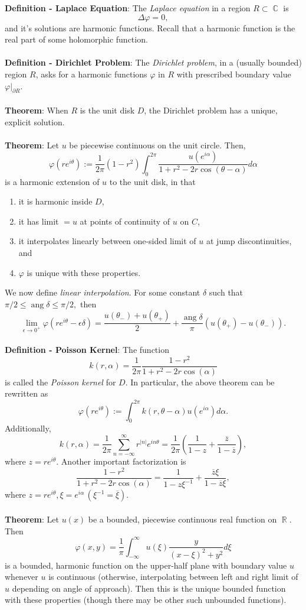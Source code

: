 \documentclass{article}
\DeclareMathOperator{\R}{\mathbb{R}}
\DeclareMathOperator{\C}{\mathbb{C}}
\DeclareMathOperator{\ang}{ang}
\begin{document}
\textbf{Definition - Laplace Equation}: The \textit{Laplace equation} in a region $R \subset \C$ is $$\Delta \varphi = 0,$$ and it's solutions are harmonic functions. Recall that a harmonic function is the real part of some holomorphic function. \\ \\
\textbf{Definition - Dirichlet Problem}: The \textit{Dirichlet problem}, in a (usually bounded) region $R$, asks for a harmonic functions $\varphi$ in $R$ with prescribed boundary value $\varphi|_{\partial R}$. \\ \\
\textbf{Theorem}: When $R$ is the unit disk $D$, the Dirichlet problem has a unique, explicit solution. \\ \\
\textbf{Theorem}: Let $u$ be piecewise continuous on the unit circle. Then, $$\varphi(re^{i\theta}) := \frac{1}{2\pi} (1 - r^2) \int_0^{2\pi} \frac{u(e^{i\alpha})}{1 + r^2 - 2r\cos(\theta - \alpha)} d\alpha$$ is a harmonic extension of $u$ to the unit disk, in that \begin{enumerate}
    \item it is harmonic inside $D$,
    \item it has limit $= u$ at points of continuity of $u$ on $C$,
    \item it interpolates linearly between one-sided limit of $u$ at jump discontinuities, and
    \item $\varphi$ is unique with these properties.
\end{enumerate} We now define \textit{linear interpolation}. For some constant $\delta$ such that $\pi/2 \leq \ang \delta \leq \pi/2,$ then $$\lim_{\epsilon \rightarrow 0^+} \varphi(re^{i\theta} - \epsilon \delta) = \frac{u(\theta_-) + u(\theta_+)}{2} + \frac{\ang \delta}{\pi}(u(\theta_+) - u(\theta_-)).$$ \\
\textbf{Definition - Poisson Kernel}: The function $$k(r, \alpha) = \frac{1}{2\pi} \frac{1 - r^2}{1 + r^2 - 2r\cos(\alpha)}$$ is called the \textit{Poisson kernel} for $D$. In particular, the above theorem can be rewritten as $$\varphi(re^{i\theta}) := \int_0^{2\pi} 
k(r, \theta - \alpha)u(e^{i\alpha}) d\alpha.$$ Additionally, $$k(r, \alpha) = \frac{1}{2\pi} \sum_{n = -\infty}^\infty r^{|n|} e^{in\theta} = \frac{1}{2\pi} \left( \frac{1}{1 - z} + \frac{\overline{z}}{1 - \overline{z}} \right),$$ where $z = re^{i\theta}$. Another important factorization is $$\frac{1 - r^2}{1 + r^2 - 2r\cos(\alpha)} = \frac{1}{1 - z \xi^{-1}} + \frac{\overline{z} \xi}{1 - \overline{z}\xi},$$ where $z = re^{i\theta}, \xi = e^{i\alpha} \, (\xi^{-1} = \overline{\xi})$. \\ \\
\textbf{Theorem}: Let $u(x)$ be a bounded, piecewise continuous real function on $\R$. Then $$\varphi(x, y) = \frac{1}{\pi} \int_{-\infty}^\infty u(\xi) \frac{y}{(x - \xi)^2 + y^2} d\xi$$ is a bounded, harmonic function on the upper-half plane with boundary value $u$ whenever $u$ is continuous (otherwise, interpolating between left and right limit of $u$ depending on angle of approach). Then this is the unique bounded function with these properties (though there may be other such unbounded functions). \\ \\
\end{document}
